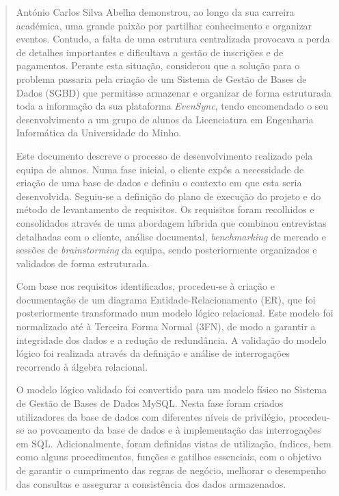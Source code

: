 \documentclass[runningheads]{llncs}
\begin{document}
        \newpage
        \begin{abstract}
        António Carlos Silva Abelha demonstrou, ao longo da sua carreira académica, uma grande paixão por partilhar 
        conhecimento e organizar eventos. Contudo, a falta de uma estrutura centralizada provocava a perda 
        de detalhes importantes e dificultava a gestão de inscrições e de pagamentos. Perante esta situação, 
        considerou que a solução para o problema passaria pela criação de um Sistema de Gestão de Bases de 
        Dados (SGBD) que permitisse armazenar e organizar de forma estruturada toda a informação da sua 
        plataforma \textit{EvenSync}, tendo encomendado o seu desenvolvimento a um grupo de alunos da Licenciatura 
        em Engenharia Informática da Universidade do Minho.

        \vspace{0.3cm}
        Este documento descreve o processo de desenvolvimento realizado pela equipa de alunos. Numa fase inicial, 
        o cliente expôs a necessidade de criação de uma base de dados e definiu o contexto em que esta seria 
        desenvolvida. Seguiu-se a definição do plano de execução do projeto e do método de levantamento de requisitos. 
        Os requisitos foram recolhidos e consolidados através de uma abordagem híbrida que combinou entrevistas detalhadas 
        com o cliente, análise documental, \textit{benchmarking} de mercado e sessões de \textit{brainstorming} da equipa, 
        sendo posteriormente organizados e validados de forma estruturada.

        \vspace{0.3cm}
        Com base nos requisitos identificados, procedeu-se à criação e documentação de um diagrama Entidade-Relacionamento 
        (ER), que foi posteriormente transformado num modelo lógico relacional. Este modelo foi normalizado até à Terceira 
        Forma Normal (3FN), de modo a garantir a integridade dos dados e a redução de redundância. A validação do modelo 
        lógico foi realizada através da definição e análise de interrogações recorrendo à álgebra relacional.

        \vspace{0.3cm}
        O modelo lógico validado foi convertido para um modelo físico no Sistema de Gestão de Bases de Dados MySQL. 
        Nesta fase foram criados utilizadores da base de dados com diferentes níveis de privilégio, procedeu-se ao 
        povoamento da base de dados e à implementação das interrogações em SQL. Adicionalmente, foram definidas vistas 
        de utilização, índices, bem como alguns procedimentos, funções e gatilhos essenciais, com o objetivo de garantir 
        o cumprimento das regras de negócio, melhorar o desempenho das consultas e assegurar a consistência dos dados 
        armazenados.
        

\end{abstract}
\end{document}
